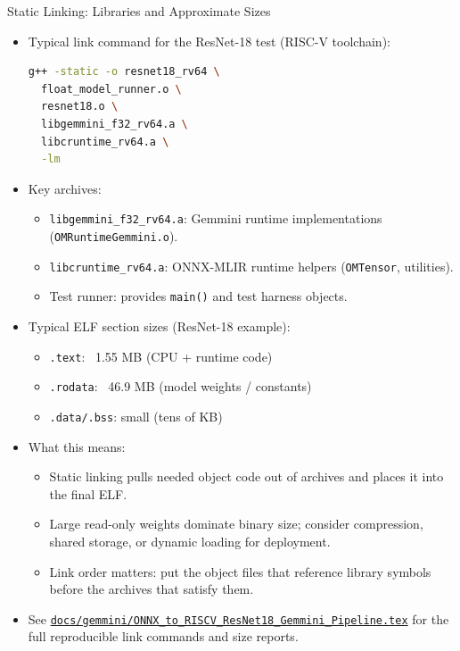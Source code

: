 \documentclass[aspectratio=169,10pt]{beamer}
\newcommand{\code}[1]{\texttt{\footnotesize #1}}
\newcommand{\repoRoot}{/home/lahcen/toolchains/onnx-mlir-xcompile/onnx-mlir}
\newcommand{\pathcode}[1]{\href{run:\repoRoot/#1}{\texttt{\scriptsize #1}}}
\begin{document}
\begin{frame}{Static Linking: Libraries and Approximate Sizes}
  \scriptsize
  \begin{itemize}
    \item Typical link command for the ResNet-18 test (RISC-V toolchain):
      \begin{lstlisting}[language=bash]
g++ -static -o resnet18_rv64 \
  float_model_runner.o \
  resnet18.o \
  libgemmini_f32_rv64.a \
  libcruntime_rv64.a \
  -lm
      \end{lstlisting}
    \item Key archives:
      \begin{itemize}
        \item \code{libgemmini_f32_rv64.a}: Gemmini runtime implementations (\code{OMRuntimeGemmini.o}).
        \item \code{libcruntime_rv64.a}: ONNX-MLIR runtime helpers (\code{OMTensor}, utilities).
        \item Test runner: provides \code{main()} and test harness objects.
      \end{itemize}
    \item Typical ELF section sizes (ResNet-18 example):
      \begin{itemize}
        \item \texttt{.text}: ~1.55 MB (CPU + runtime code)
        \item \texttt{.rodata}: ~46.9 MB (model weights / constants)
        \item \texttt{.data/.bss}: small (tens of KB)
      \end{itemize}
    \item What this means:
      \begin{itemize}
        \item Static linking pulls needed object code out of archives and places it into the final ELF.
        \item Large read-only weights dominate binary size; consider compression, shared storage, or dynamic loading for deployment.
        \item Link order matters: put the object files that reference library symbols before the archives that satisfy them.
      \end{itemize}
    \item See \pathcode{docs/gemmini/ONNX_to_RISCV_ResNet18_Gemmini_Pipeline.tex} for the full reproducible link commands and size reports.
  \end{itemize}
\end{frame}
\end{document}

